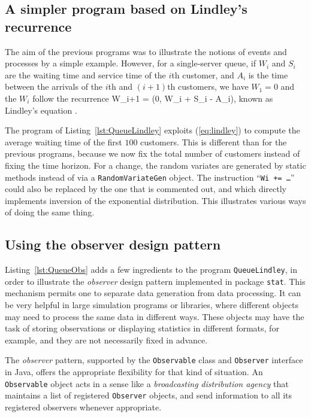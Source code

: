 \subsection {A simpler program based on Lindley's recurrence}

The aim of the previous programs was
to illustrate the notions of events and processes by a simple example.
However, for a single-server queue, 
if $W_i$ and $S_i$ are the waiting time and service time of the
$i$th customer, and $A_i$ is the time between the arrivals of
the $i$th and $(i+1)$th customers, we have $W_1=0$ and the $W_i$ 
follow the recurrence
\eq
  W_{i+1} = \max(0,\; W_i + S_i - A_i),               \label {eq:lindley}
\endeq
known as Lindley's equation \cite {pKLE75a}.

The program of Listing~\ref{lst:QueueLindley} exploits (\ref{eq:lindley})
to compute the average waiting time of the first $100$ customers.
This is different than for the previous programs, because we now fix
the total number of customers instead of fixing the time horizon.
For a change, the random variates are generated by static methods
instead of via a \texttt{RandomVariateGen} object.
The instruction ``\texttt{Wi += \dots}'' could also be replaced by the
one that is commented out, and which directly implements inversion 
of the exponential distribution.
This illustrates various ways of doing the same thing.


\bigskip


\subsection{Using the observer design pattern}

Listing~\ref{lst:QueueObs} adds a few ingredients to the program
\texttt{QueueLindley}, in order to illustrate the \emph{observer}
design pattern implemented in package \texttt{stat}.  
This mechanism permits one to separate data generation from data 
processing.  It can be very helpful in large simulation programs or 
libraries, where different objects may need to process the same data 
in different ways.  These objects may have the task of storing observations
or displaying statistics in different formats, for example, and they are
not necessarily fixed in advance.

The \emph{observer} pattern, supported by the \texttt{Observable}
class and \texttt{Observer} interface in Java,
offers the appropriate flexibility for that kind of situation.
An \texttt{Observable} object acts in a sense like a \emph{broadcasting}
\emph{distribution agency} that maintains a list of registered 
\texttt{Observer} objects, and send information to all its registered
observers whenever appropriate.

